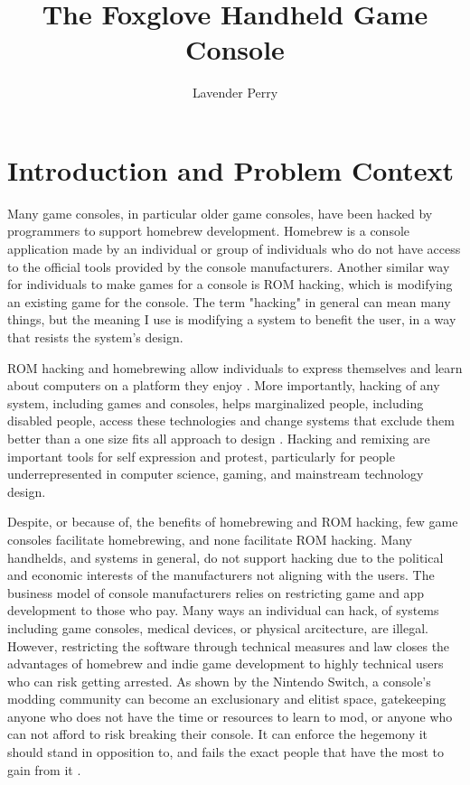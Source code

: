 \documentclass[10pt,twocolumn]{article}
\title{The Foxglove Handheld Game Console}
\author{Lavender Perry}
\affiliation{Occidental College}
\begin{document}
\maketitle

\section{Introduction and Problem Context}

Many game consoles, in particular older game consoles, have been hacked by
programmers to support homebrew development. Homebrew is a console application
made by an individual or group of individuals who do not have access to the
official tools provided by the console manufacturers. Another similar way for
individuals to make games for a console is ROM hacking, which is modifying
an existing game for the console. The term "hacking" in general can mean many
things, but the meaning I use is modifying a system to benefit the user, in a
way that resists the system's design.

ROM hacking and homebrewing allow
individuals to express themselves and learn about computers on a platform they
enjoy \cite{kacmarcik_introducing_2009}. More importantly, hacking of any
system, including games and consoles, helps marginalized people, including
disabled people, access these technologies and change systems that exclude them
better than a one size fits all approach to design \cite{hamraie_crip_2019}.
Hacking and remixing are important tools for self expression and protest,
particularly for people underrepresented in computer science, gaming, and
mainstream technology design.

Despite, or because of, the benefits of homebrewing and ROM hacking, few game
consoles facilitate homebrewing, and none facilitate ROM hacking. Many
handhelds, and systems in general, do not support hacking due to the political
and economic interests of the manufacturers not aligning with the users. The
business model of console manufacturers relies on restricting game and app
development to those who pay. Many ways an individual can hack, of systems
including game consoles, medical devices, or physical arcitecture, are illegal.
However, restricting the software through technical measures and law
closes the advantages of homebrew and indie
game development to highly technical users who can risk getting arrested.
As shown by the Nintendo Switch, a console's modding community
can become an exclusionary and elitist space, gatekeeping anyone who does not
have the time or resources to learn to mod, or anyone who can not afford to risk
breaking their console.
It can enforce the hegemony it should stand in opposition to, and fails the
exact people that have the most to gain from it \cite{brown_why_2022}.
\end{document}
